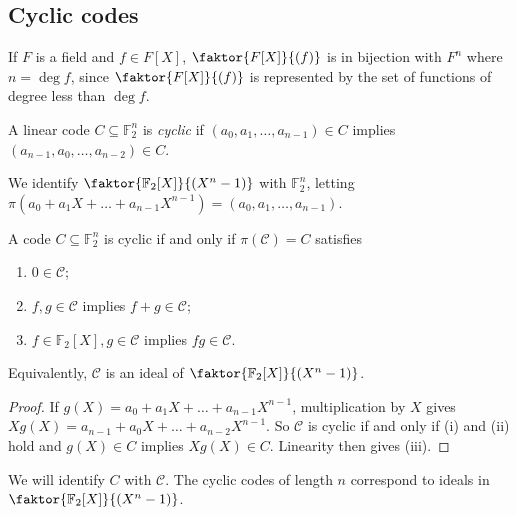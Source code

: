 \subsection{Cyclic codes}
If \( F \) is a field and \( f \in F[X] \), \( \faktor{F[X]}{(f)} \) is in bijection with \( F^n \) where \( n = \deg f \), since \( \faktor{F[X]}{(f)} \) is represented by the set of functions of degree less than \( \deg f \).
\begin{definition}
    A linear code \( C \subseteq \mathbb F_2^n \) is \emph{cyclic} if \( (a_0, a_1, \dots, a_{n-1}) \in C \) implies \( (a_{n-1}, a_0, \dots, a_{n-2}) \in C \).
\end{definition}
We identify \( \faktor{\mathbb F_2[X]}{(X^n - 1)} \) with \( \mathbb F_2^n \), letting \( \pi(a_0 + a_1X + \dots + a_{n-1}X^{n-1}) = (a_0, a_1, \dots, a_{n-1}) \).
\begin{lemma}
    A code \( C \subseteq \mathbb F_2^n \) is cyclic if and only if \( \pi(\mathcal C) = C \) satisfies
    \begin{enumerate}
        \item \( 0 \in \mathcal C \);
        \item \( f, g \in \mathcal C \) implies \( f + g \in \mathcal C \);
        \item \( f \in \mathbb F_2[X], g \in \mathcal C \) implies \( fg \in \mathcal C \).
    \end{enumerate}
\end{lemma}
Equivalently, \( \mathcal C \) is an ideal of \( \faktor{\mathbb F_2[X]}{(X^n - 1)} \).
\begin{proof}
    If \( g(X) = a_0 + a_1X + \dots + a_{n-1}X^{n-1} \), multiplication by \( X \) gives \( Xg(X) = a_{n-1} + a_0X + \dots + a_{n-2}X^{n-1} \).
    So \( \mathcal C \) is cyclic if and only if (i) and (ii) hold and \( g(X) \in C \) implies \( Xg(X) \in C \).
    Linearity then gives (iii).
\end{proof}
We will identify \( C \) with \( \mathcal C \).
The cyclic codes of length \( n \) correspond to ideals in \( \faktor{\mathbb F_2[X]}{(X^n - 1)} \).
